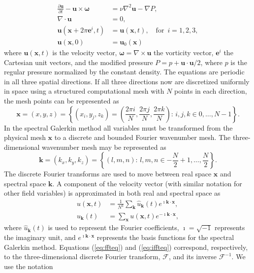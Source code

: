 \documentclass[11pt, oneside]{article}
\begin{document}
\begin{align}
 \frac{\partial \bm{u}}{\partial t} - \bm{u} \times \bm{\omega}   &= \nu \nabla^2 \bm{u} - \nabla{P}, \label{eq:NS} \\
 \nabla \cdot \bm{u} &= 0, \\
 \bm{u}(\bm{x}+2\pi \bm{e}^i, t) &= \bm{u}(\bm{x}, t), \quad \text{for }\, i=1,2,3,\\
 \bm{u}(\bm{x}, 0) &= \bm{u}_0(\bm{x})
\end{align}
where $\bm{u}(\bm{x}, t)$ is the velocity vector, $\bm{\omega}=\nabla \times \bm{u}$ the vorticity vector, $\bm{e}^i$ the Cartesian unit vectors, and the modified pressure $P=p+\bm{u}\cdot \bm{u}/2$, where $p$ is the regular pressure normalized by the constant density. The equations are periodic in all three spatial directions. If all three directions now are discretized uniformly in space using a structured computational mesh with $N$ points in each direction, the mesh points can be represented as
\begin{equation}
\bm{x} = (x, y, z) = \left\{(x_i, y_j, z_k) = \left( \frac{2\pi i}{N}, \frac{2\pi j}{N}, \frac{2\pi k}{N} \right): \, i,j,k \in 0,\ldots, N-1 \right\}.
\label{eq:realmesh}
\end{equation}
In the spectral Galerkin method all variables must be transformed from the physical mesh $\bm{x}$ to a discrete and bounded Fourier wavenumber mesh. The three-dimensional wavenumber mesh may be represented as
\begin{equation}
\bm{k} = (k_x, k_y, k_z) = \left\{(l, m, n): \, l, m, n \in -\frac{N}{2}+1,\ldots, \frac{N}{2} \right\}.
\label{eq:realmesh}
\end{equation}
The discrete Fourier transforms are used to move between real space $\bm{x}$ and spectral space $\bm{k}$. A component of the velocity vector (with similar notation for other field variables) is approximated in both real and spectral space as
\begin{align}
u(\bm{x}, t) &= \frac{1}{N^3}\sum_{\bm{k}} \hat{u}_{\bm{k}}(t) e^{\imath \bm{k}\cdot \bm{x}}, \label{eq:ffteq} \\
\hat{u}_{\bm{k}}(t) &= \sum_{\bm{x}} u(\bm{x}, t) e^{-\imath \bm{k}\cdot \bm{x}},\label{eq:iffteq}
\end{align}
where $\hat{u}_{\bm{k}}(t)$ is used to represent the Fourier coefficients, $\imath=\sqrt{-1}$ represents the imaginary unit, and $e^{\imath \bm{k}\cdot \bm{x}}$ represents the basis functions for the spectral Galerkin method. Equations (\ref{eq:ffteq}) and (\ref{eq:iffteq}) correspond, respectively, to the three-dimensional discrete Fourier transform, $\mathcal{F}$, and its inverse $\mathcal{F}^{-1}$. We use the notation
\end{document}
